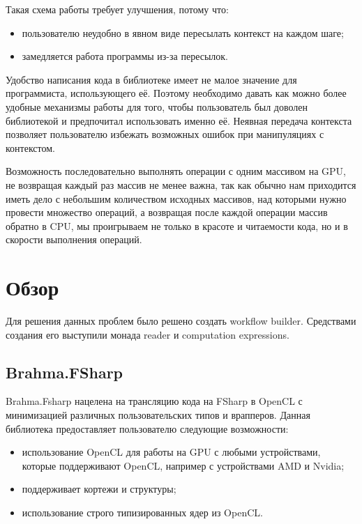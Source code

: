 \documentclass[14pt]{matmex-diploma-custom}
\begin{document}
Такая схема работы требует улучшения, потому что:
\begin{itemize}
\item пользователю неудобно в явном виде пересылать контекст на каждом шаге;
\item замедляется работа программы из-за пересылок.
\end{itemize}

Удобство написания кода в библиотеке имеет не малое значение для программиста, использующего её. Поэтому необходимо давать как можно более удобные механизмы работы для того, чтобы пользователь был доволен библиотекой и предпочитал использовать именно её. Неявная передача контекста позволяет пользователю избежать возможных ошибок при манипуляциях с контекстом.

Возможность последовательно выполнять операции с одним массивом на GPU, не возвращая каждый раз массив не менее важна, так как обычно нам приходится иметь дело с небольшим количеством исходных массивов, над которыми нужно провести множество операций, а возвращая после каждой операции массив обратно в CPU, мы проигрываем не только в красоте и читаемости кода, но и в скорости выполнения операций.


\section{Обзор}
Для решения данных проблем было решено создать workflow builder. Средствами создания его выступили монада reader и computation expressions.
\subsection {Brahma.FSharp}
Brahma.Fsharp нацелена на трансляцию кода на FSharp в OpenCL с минимизацией различных пользовательских типов и врапперов.
Данная библиотека предоставляет пользователю следующие возможности:
\begin{itemize}
\item использование OpenCL для работы на GPU с любыми устройствами, которые поддерживают OpenCL, например с устройствами AMD и Nvidia;
\item поддерживает кортежи и структуры;
\item использование строго типизированных ядер из OpenCL.
\end{itemize}
\end{document}
